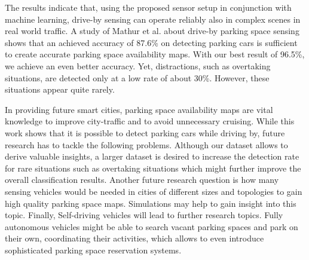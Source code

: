 The results indicate that, using the proposed sensor setup in conjunction with machine learning, drive-by sensing can operate reliably also in complex scenes in real world traffic. 
A study of Mathur et al. about drive-by parking space sensing \cite{Mathur:2010:PDS:1814433.1814448} shows that an achieved accuracy of 87.6\% on detecting parking cars is sufficient to create accurate parking space availability maps. With our best result of 96.5\%, we achieve an even better accuracy.
Yet, distractions, such as overtaking situations, are detected only at a low rate of about 30\%. However, these situations appear quite rarely.

In providing future smart cities, parking space availability maps are vital knowledge to improve city-traffic and to avoid unnecessary cruising.
While this work shows that it is possible to detect parking cars while driving by, future research has to tackle the following problems. Although our dataset allows to derive valuable insights, a larger dataset is desired to increase the detection rate for rare situations such as overtaking situations which might further improve the overall classification results. Another future research question is how many sensing vehicles would be needed in cities of different sizes and topologies to gain high quality parking space maps. Simulations may help to gain insight into this topic. Finally, Self-driving vehicles will lead to further research topics. Fully autonomous vehicles might be able to search vacant parking spaces and park on their own, coordinating their activities, which allows to even introduce sophisticated parking space reservation systems.










